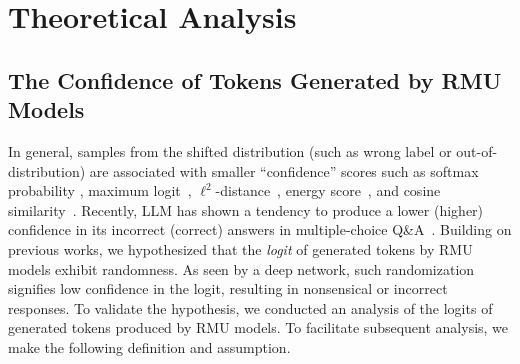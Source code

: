 \documentclass[letterpaper]{article} %
\begin{document}
\section{Theoretical Analysis}

\subsection{The Confidence of Tokens Generated by RMU Models}
\label{sec:3.1}
In general, samples from the shifted distribution (such as wrong label or out-of-distribution) are associated with smaller ``confidence'' scores such as softmax probability \cite{hendrycks2017a, northcutt2021confident}, maximum logit~\cite{pmlr-v162-hendrycks22a, wei2022mitigating}, $\ell^2$-distance~\cite{sun2022out}, energy score~\cite{liu2020energy}, and cosine similarity~\cite{ngoc2023cosine}. Recently, LLM has shown a tendency to produce a lower (higher) confidence in its incorrect (correct) answers in multiple-choice Q\&A~\cite{plaut2024softmax}. Building on previous works, we hypothesized that the \textit{logit} of generated tokens by RMU models exhibit randomness. As seen by a deep network, such randomization signifies low confidence in the logit, resulting in nonsensical or incorrect responses. To validate the hypothesis, we conducted an analysis of the logits of generated tokens produced by RMU models. To facilitate subsequent analysis, we make the following definition and assumption.
\end{document}

